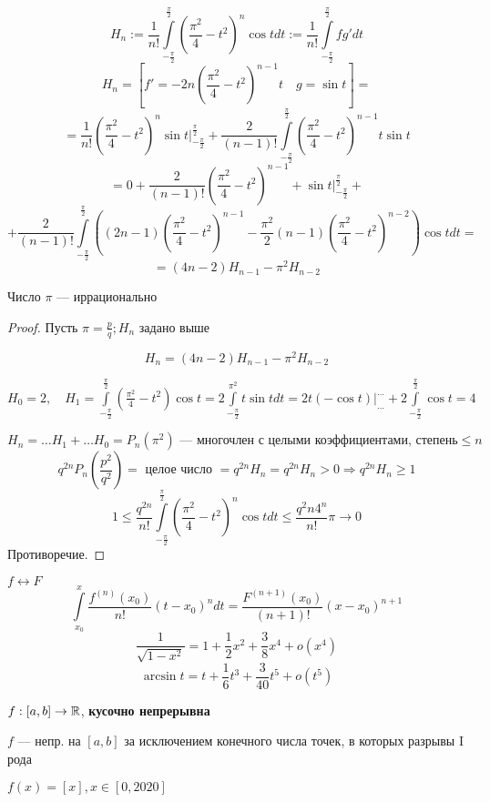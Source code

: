 \begin{example}
    $$H_n:=\frac{1}{n!}\int\limits_{-\frac{\pi}{2}}^{\frac{\pi}{2}}\left(\frac{\pi^2}{4}-t^2\right)^n\cos t dt:=\frac{1}{n!}\int\limits_{-\frac{\pi}{2}}^{\frac{\pi}{2}} fg' dt$$
    $$H_n=\left[f'=-2n\left(\frac{\pi^2}{4}-t^2\right)^{n-1}t \quad g=\sin t\right]=$$
    $$=\frac{1}{n!}\left(\frac{\pi^2}{4}-t^2\right)^n\sin t|_{-\frac{\pi}{2}}^{\frac{\pi}{2}}+\frac{2}{(n-1)!}\int\limits_{-\frac{\pi}{2}}^{\frac{\pi}{2}} \left(\frac{\pi^2}{4}-t^2\right)^{n-1}t\sin t$$
    $$=0+\frac{2}{(n-1)!}\left(\frac{\pi^2}{4}-t^2\right)^{n-1}+\sin t|_{-\frac{\pi}{2}}^{\frac{\pi}{2}}+$$
    $$+\frac{2}{(n-1)!}\int\limits_{-\frac{\pi}{2}}^{\frac{\pi}{2}}\left((2n-1)\left(\frac{\pi^2}{4}-t^2\right)^{n-1}-\frac{\pi^2}{2}(n-1)\left(\frac{\pi^2}{4}-t^2\right)^{n-2}\right)\cos t dt=$$
    $$=(4n-2)H_{n-1}-\pi^2H_{n-2}$$
\end{example}

\begin{theorem}
    Число $\pi$ --- иррационально
\end{theorem}
\begin{proof}
    Пусть $\pi=\frac{p}{q}; H_n$ задано выше

    $$H_n=(4n-2)H_{n-1}-\pi^2 H_{n-2}$$
    
    $H_0 = 2, \quad H_1=\int\limits_{-\frac{\pi}{2}}^{\frac{\pi}{2}}(\frac{\pi^2}{4}-t^2)\cos t = 2\int\limits_{-\frac{\pi}{2}}^{\pi^2} t\sin t dt = 2t(-\cos t)|_{\ldots}^{\ldots}+2\int\limits_{-\frac{\pi}{2}}^{\frac{\pi}{2}} \cos t = 4$

    $$H_n=\ldots H_1+\ldots H_0 = P_n(\pi^2) \text{ --- многочлен с целыми коэффициентами, степень}\leq n$$
    $$q^{2n}P_n\left(\frac{p^2}{q^2}\right)=\text{ целое число }=q^{2n}H_n=q^{2n}H_n>0 \Rightarrow q^{2n}H_n\geq 1$$
    $$1\leq\frac{q^{2n}}{n!}\int\limits_{-\frac{\pi}{2}}^{\frac{\pi}{2}}\left(\frac{\pi^2}{4}-t^2\right)^n\cos t dt \leq \frac{q^2n 4^n}{n!}\pi\to0$$
    Противоречие.
\end{proof}

$f\leftrightarrow F$
$$\int\limits_{x_0}^x\frac{f^{(n)}(x_0)}{n!}(t-x_0)^ndt = \frac{F^{(n+1)}(x_0)}{(n+1)!}(x-x_0)^{n+1}$$
$$\frac{1}{\sqrt{1-x^2}}=1+\frac{1}{2}x^2+\frac{3}{8}x^4+o(x^4)$$
$$\arcsin t = t + \frac{1}{6}t^3 + \frac{3}{40} t^5 + o(t^5)$$

\begin{definition}
    $f:[a,b] \to \mathbb{R}$, \textbf{кусочно непрерывна}

    $f$ --- непр. на $[a,b]$ за исключением конечного числа точек, в которых разрывы I рода
    \begin{example}
        $f(x) = [x], x\in[0, 2020]$
    \end{example}
\end{definition}

